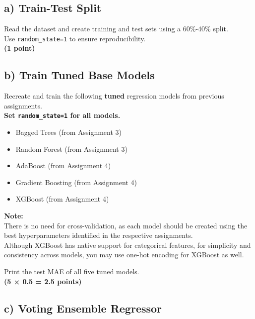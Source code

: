 \documentclass[
  letterpaper,
  DIV=11,
  numbers=noendperiod]{scrreprt}
\providecommand{\tightlist}{%
  \setlength{\itemsep}{0pt}\setlength{\parskip}{0pt}}\usepackage{longtable,booktabs,array}
\begin{document}
\subsection{a) Train-Test Split}\label{a-train-test-split}

Read the dataset and create training and test sets using a 60\%-40\%
split.\\
Use \texttt{random\_state=1} to ensure reproducibility.\\
\textbf{(1 point)}

\subsection{b) Train Tuned Base Models}\label{b-train-tuned-base-models}

Recreate and train the following \textbf{tuned} regression models from
previous assignments.\\
\textbf{Set \texttt{random\_state=1} for all models.}

\begin{itemize}
\tightlist
\item
  Bagged Trees (from Assignment 3)\\
\item
  Random Forest (from Assignment 3)\\
\item
  AdaBoost (from Assignment 4)\\
\item
  Gradient Boosting (from Assignment 4)\\
\item
  XGBoost (from Assignment 4)
\end{itemize}

\textbf{Note:}\\
There is no need for cross-validation, as each model should be created
using the best hyperparameters identified in the respective
assignments.\\
Although XGBoost has native support for categorical features, for
simplicity and consistency across models, you may use one-hot encoding
for XGBoost as well.

Print the test MAE of all five tuned models.\\
\textbf{(5 × 0.5 = 2.5 points)}

\subsection{c) Voting Ensemble
Regressor}\label{c-voting-ensemble-regressor}
\end{document}
